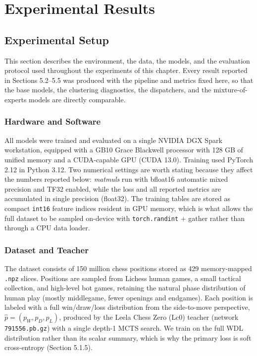 \chapter{Experimental Results}

\section{Experimental Setup}

This section describes the environment, the data, the models, and the evaluation protocol used throughout the experiments of this chapter. Every result reported in Sections 5.2--5.5 was produced with the pipeline and metrics fixed here, so that the base models, the clustering diagnostics, the dispatchers, and the mixture-of-experts models are directly comparable.

\subsection{Hardware and Software}

All models were trained and evaluated on a single NVIDIA DGX Spark workstation, equipped with a GB10 Grace Blackwell processor with 128 GB of unified memory and a CUDA-capable GPU (CUDA 13.0). Training used PyTorch 2.12 in Python 3.12. Two numerical settings are worth stating because they affect the numbers reported below: \emph{matmuls} run with bfloat16 automatic mixed precision and TF32 enabled, while the loss and all reported metrics are accumulated in single precision (float32). The training tables are stored as compact \texttt{int16} feature indices resident in GPU memory, which is what allows the full dataset to be sampled on-device with \texttt{torch.randint} + gather rather than through a CPU data loader.

\subsection{Dataset and Teacher}

The dataset consists of 150 million chess positions stored as 429 memory-mapped \texttt{.npz} slices. Positions are sampled from Lichess human games, a small tactical collection, and high-level bot games, retaining the natural phase distribution of human play (mostly middlegame, fewer openings and endgames). Each position is labeled with a full win/draw/loss distribution from the side-to-move perspective, $\hat{p} = (p_W, p_D, p_L)$, produced by the Leela Chess Zero (Lc0) teacher (network \texttt{791556.pb.gz}) with a single depth-1 MCTS search. We train on the full WDL distribution rather than its scalar summary, which is why the primary loss is soft cross-entropy (Section 5.1.5).

